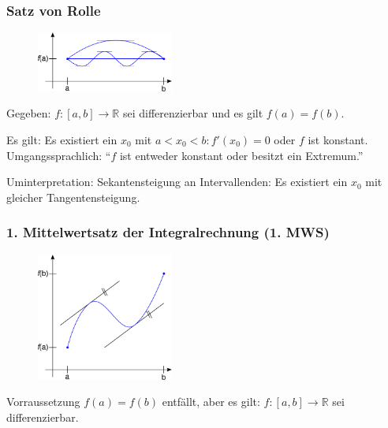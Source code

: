 \subsubsection*{Satz von Rolle}
\begin{figure}
 	\centering
	\includegraphics[width=0.4\textwidth]{include/20091201-2.pdf}
\end{figure}
Gegeben: $f:[a, b] \rightarrow \mathbb{R}$ sei differenzierbar und es gilt $f(a) = f(b)$.

Es gilt: Es existiert ein $x_0$ mit $a < x_0 < b : f'(x_0) = 0$ oder $f$ ist konstant. Umgangssprachlich: "`$f$ ist entweder konstant oder besitzt ein Extremum."'

Uminterpretation: Sekantensteigung an Intervallenden: Es existiert ein $x_0$ mit gleicher Tangentensteigung.

\subsubsection*{1. Mittelwertsatz der Integralrechnung (1. MWS)}
\begin{figure}
 	\centering
	\includegraphics[width=0.4\textwidth]{include/20091201-3.pdf}
\end{figure}
Vorraussetzung $f(a) = f(b)$ entfällt, aber es gilt: $f:[a,b] \rightarrow \mathbb{R}$ sei differenzierbar.

